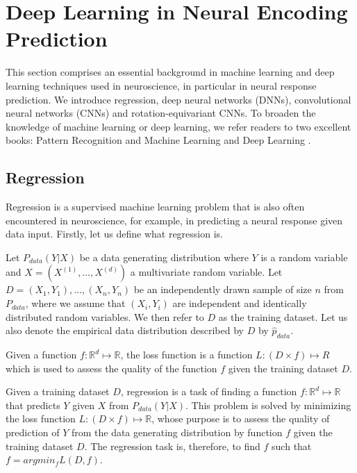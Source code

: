 \chapter{Deep Learning in Neural Encoding Prediction}

This section comprises an essential background in machine learning and deep learning techniques used in neuroscience, in particular in neural response prediction. We introduce regression, deep neural networks (DNNs), convolutional neural networks (CNNs) and rotation-equivariant CNNs. To broaden the knowledge of machine learning or deep learning, we refer readers to two excellent books: Pattern Recognition and Machine Learning \citep{bishop2006pattern} and Deep Learning \citep{Goodfellow-et-al-2016}.

\section{Regression}

Regression is a supervised machine learning problem that is also often encountered in neuroscience, for example, in predicting a neural response given data input. Firstly, let us define what regression is.

\begin{defn}\label{def01:1}
	Let $P_{data}(Y|X)$ be a data generating distribution where $Y$ is a random variable and $X = (X^{(1)}, … , X^{(d)})$ a multivariate random variable. Let $D = {(X_1, Y_1), \dots, (X_n, Y_n)}$ be an independently drawn sample of size $n$ from $P_{data}$, where we assume that $(X_i, Y_i)$ are independent and identically distributed random variables. We then refer to $D$ as the training dataset. Let us also denote the empirical data distribution described by $D$ by $\hat{p}_{data}$.
\end{defn}

\begin{defn}\label{def01:2}
Given a function $f: \mathbb{R}^d \mapsto \mathbb{R}$, the loss function is a function $L: (D \times f) \mapsto R$ which is used to assess the quality of the function $f$ given the training dataset $D$.
\end{defn}

\begin{defn}[Regression]\label{def01:3}
Given a training dataset $D$, regression is a task of finding a function $f: \mathbb{R}^d \mapsto \mathbb{R}$ that predicts $Y$ given $X$ from $P_{data}(Y|X)$. This problem is solved by minimizing the loss function $L: (D \times f) \mapsto \mathbb{R}$, whose purpose is to assess the quality of prediction of $Y$ from the data generating distribution by function $f$ given the training dataset $D$. The regression task is, therefore, to find $f$ such that $f = argmin_f L(D, f)$. 
\end{defn}

